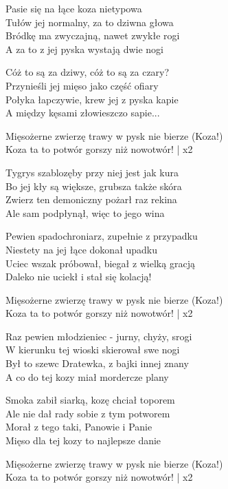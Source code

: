 \begin{text}
    Pasie się na łące koza nietypowa\\
    Tułów jej normalny, za to dziwna głowa\\
    Bródkę ma zwyczajną, nawet zwykłe rogi\\ 
    A za to z jej pyska wystają dwie nogi
	
    Cóż to są za dziwy, cóż to są za czary?\\
    Przynieśli jej mięso jako część ofiary\\
    Połyka łapczywie, krew jej z pyska kapie\\
    A między kęsami złowieszczo sapie...

    \vin Mięsożerne zwierzę trawy w pysk nie bierze (Koza!)\\
    \vin Koza ta to potwór gorszy niż nowotwór! | x2

    Tygrys szablozęby przy niej jest jak kura\\
    Bo jej kły są większe, grubsza także skóra\\
    Zwierz ten demoniczny pożarł raz rekina\\
    Ale sam podpłynął, więc to jego wina

    Pewien spadochroniarz, zupełnie z przypadku\\
    Niestety na jej łące dokonał upadku\\
    Uciec wszak próbował, biegał z wielką gracją\\
    Daleko nie uciekł i stał się kolacją!

    \vin Mięsożerne zwierzę trawy w pysk nie bierze (Koza!)\\
    \vin Koza ta to potwór gorszy niż nowotwór! | x2

    Raz pewien młodzieniec - jurny, chyży, srogi\\
    W kierunku tej wioski skierował swe nogi\\
    Był to szewc Dratewka, z bajki innej znany\\
    A co do tej kozy miał mordercze plany

    Smoka zabił siarką, kozę chciał toporem\\
    Ale nie dał rady sobie z tym potworem\\
    Morał z tego taki, Panowie i Panie\\
    Mięso dla tej kozy to najlepsze danie

    \vin Mięsożerne zwierzę trawy w pysk nie bierze (Koza!)\\
    \vin Koza ta to potwór gorszy niż nowotwór! | x2

\end{text}
